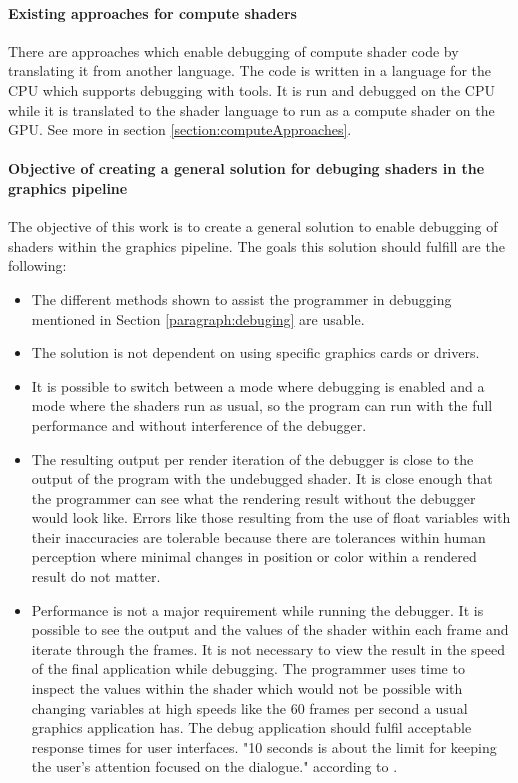 \paragraph{Existing approaches for compute shaders}

There are approaches which enable debugging of compute shader code by translating it from another language. The code is written in a language for the CPU which supports debugging with tools. It is  run and debugged on the CPU while it is translated to the shader language to run as a compute shader on the GPU.
See more in section \ref{section:computeApproaches}.

\paragraph{Objective of creating a general solution for debuging shaders in the graphics pipeline}

The objective of this work is to create a general solution to enable debugging of shaders within the graphics pipeline. The goals this solution should fulfill are the following:

\begin{itemize}
	\item The different methods shown to assist the programmer in debugging mentioned in Section \ref{paragraph:debuging} are usable.
	\item The solution is not dependent on using specific graphics cards or drivers.
	\item It is possible to switch between a mode where debugging is enabled and a mode where the shaders run as usual, so the program can run with the full performance and without interference of the debugger.
	\item The resulting output per render iteration of the debugger is close to the output of the program with the undebugged shader. It is close enough that the programmer can see what the rendering result without the debugger would look like. Errors like those resulting from the use of float variables with their inaccuracies are tolerable because there are tolerances within human perception where minimal changes in position or color within a rendered result do not matter.
	\item Performance is not a major requirement while running the debugger. It is possible to see the output and the values of the shader within each frame and iterate through the frames. It is not necessary to view the result in the speed of the final application while debugging. The programmer uses time to inspect the values within the shader which would not be possible with changing variables at high speeds like the 60 frames per second a usual graphics application has. The debug application should fulfil acceptable response times for user interfaces. "10 seconds is about the limit for keeping the user's attention focused on the dialogue." according to .
\end{itemize}




